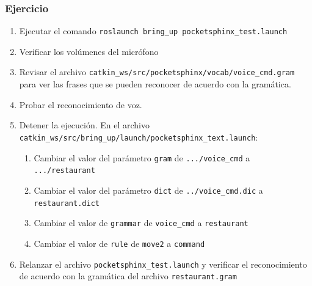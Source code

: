 \documentclass[10pt,spanish,aspectratio=1610]{beamer}
\begin{document}
\begin{frame}\frametitle{Ejercicio}
  \begin{enumerate}
  \item Ejecutar el comando \texttt{roslaunch bring\_up pocketsphinx\_test.launch}
  \item Verificar los volúmenes del micrófono
  \item Revisar el archivo \texttt{catkin\_ws/src/pocketsphinx/vocab/voice\_cmd.gram} para ver las frases que se pueden reconocer de acuerdo con la gramática.
  \item Probar el reconocimiento de voz.
  \item Detener la ejecución. En el archivo \texttt{catkin\_ws/src/bring\_up/launch/pocketsphinx\_text.launch}:
    \begin{enumerate}
    \item Cambiar el valor del parámetro \texttt{gram} de \texttt{.../voice\_cmd} a \texttt{.../restaurant}
    \item Cambiar el valor del parámetro \texttt{dict} de \texttt{../voice\_cmd.dic} a \texttt{restaurant.dict}
    \item Cambiar el valor de \texttt{grammar} de \texttt{voice\_cmd} a \texttt{restaurant}
    \item Cambiar el valor de \texttt{rule} de \texttt{move2} a \texttt{command}
    \end{enumerate}
  \item Relanzar el archivo \texttt{pocketsphinx\_test.launch} y verificar el reconocimiento de acuerdo con la gramática del archivo \texttt{restaurant.gram}
  \end{enumerate}
\end{frame}

\end{document}
